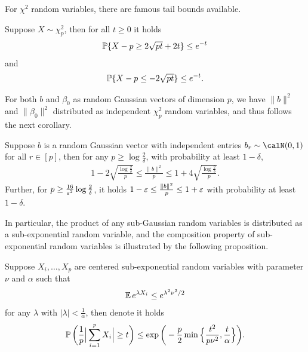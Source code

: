 For $\chi^2$ random variables, there are famous tail bounds available.
\begin{lemma}\label{lem:chi-squared-tail}
    Suppose $X\sim \chi^2_p$, then for all $t\geq 0$ it holds
    \begin{align*}
        \operatorname{\mathbb{P}}\{X-p \geq 2\sqrt{pt} + 2t\} \leq e^{-t}
    \end{align*}
    and
    \begin{align*}
        \operatorname{\mathbb{P}}\{X-p \leq -2\sqrt{pt}\} \leq e^{-t}.
    \end{align*}
\end{lemma}
For both $b$ and $\beta_0$ as random Gaussian vectors of dimension $p$, we have $\|b\|^2$ and $\|\beta_0\|^2$ distributed as independent $\chi^2_p$ random variables, and thus follows the next corollary.
\begin{corollary}\label{cor:b-norm-concentration}
    Suppose $b$ is a random Gaussian vector with independent entries $b_r\sim\calN(0,1)$ for all $r\in[p]$, then for any $p \geq \log\frac{2}{\delta}$, with probability at least $1-\delta$, 
    \begin{align*}
        1 - 2\sqrt{\frac{\log\frac{2}{\delta}}{p}} \leq \frac{\|b\|^2}{p} \leq 1 + 4\sqrt{\frac{\log\frac{2}{\delta}}{p}}.
    \end{align*}
    Further, for $p \geq \frac{16}{\varepsilon^2}\log\frac{2}{\delta}$, it holds $1-\varepsilon \leq \frac{\|b\|^2}{p} \leq 1+\varepsilon$ with probability at least $1-\delta$.
\end{corollary}
In particular, the product of any sub-Gaussian random variables is distributed as a sub-exponential random variable, and the composition property of \iid sub-exponential random variables is illustrated by the following proposition.
\begin{proposition}\label{prop:subexponential}
    Suppose $X_i,\ldots,X_p$ are \iid centered sub-exponential random variables with parameter $\nu$ and $\alpha$ such that 
    \begin{align*}
        \operatorname{\mathbb{E}} e^{\lambda X_i} \leq e^{\lambda^2\nu^2/2}
    \end{align*}
    for any $\lambda$ with $|\lambda|<\frac{1}{\alpha}$, then denote it holds
    \begin{align*}
        \operatorname{\mathbb{P}}\bigg( \frac{1}{p}\Big|\sum_{i=1}^p X_i\Big| \geq t \bigg) \leq \exp\bigg( -\frac{p}{2}\min\Big\{ \frac{t^2}{p\nu^2}, \frac{t}{\alpha} \Big\} \bigg).
    \end{align*}
\end{proposition}
